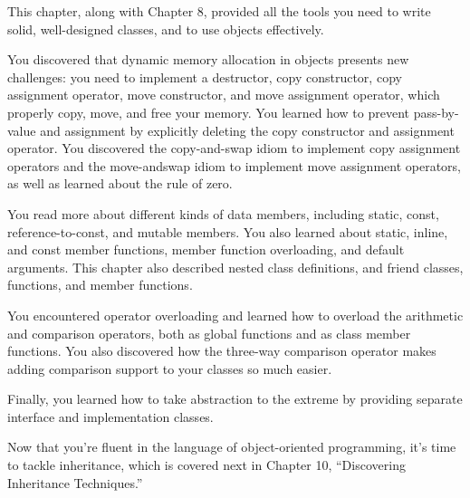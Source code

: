 
This chapter, along with Chapter 8, provided all the tools you need to write solid, well-designed classes, and to use objects effectively.

You discovered that dynamic memory allocation in objects presents new challenges: you need to implement a destructor, copy constructor, copy assignment operator, move constructor, and move assignment operator, which properly copy, move, and free your memory. You learned how to prevent pass-by-value and assignment by explicitly deleting the copy constructor and assignment operator. You discovered the copy-and-swap idiom to implement copy assignment operators and the move-andswap idiom to implement move assignment operators, as well as learned about the rule of zero.

You read more about different kinds of data members, including static, const, reference-to-const, and mutable members. You also learned about static, inline, and const member functions, member function overloading, and default arguments. This chapter also described nested class definitions, and friend classes, functions, and member functions.

You encountered operator overloading and learned how to overload the arithmetic and comparison operators, both as global functions and as class member functions. You also discovered how the three-way comparison operator makes adding comparison support to your classes so much easier.

Finally, you learned how to take abstraction to the extreme by providing separate interface and implementation classes.

Now that you’re fluent in the language of object-oriented programming, it’s time to tackle inheritance, which is covered next in Chapter 10, “Discovering Inheritance Techniques.”

